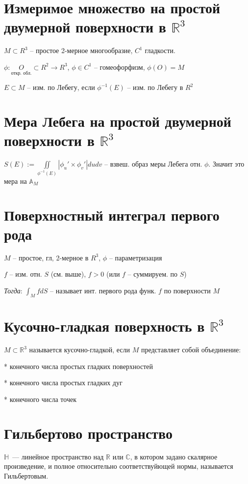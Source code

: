 \documentclass[paper=a4, fontsize=17pt]{article}
\begin{document}
	\section{Измеримое множество на простой двумерной поверхности в $\mathds{R}^3$}
	
	$ M \subset R^3 $ -- простое 2-мерное многообразие, $ C^1 $ гладкости.

	$ \phi : \underset{\text{откр. обл.}}{O} \subset R^2 \rightarrow R^3$, $ \phi \in C^1 $ -- гомеофорфизм, $ \phi(O) = M $

	$ E \subset M $ -- изм. по Лебегу, если $ \phi^{-1}(E) $ -- изм. по Лебегу в $ R^2 $
	
	\section{Мера Лебега на простой двумерной поверхности в $\mathds{R}^3$}

	$ S(E) := \iint\limits_{\phi^{-1}(E)} | \phi_u' \times \phi_v'| dudv $ -- взвеш. образ меры Лебега отн. $ \phi $. Значит это мера на $ \mathbb{A}_{M} $

	\section{Поверхностный интеграл первого рода}
        
        $ M $ -- простое, гл, 2-мерное в $ R^3 $, $ \phi $ -- параметризация

	$ f $ -- изм. отн. $S$ (см. выше), $ f > 0 $ (или $ f $ -- суммируем. по $ S $)

        \emph{Тогда}: $ \int_M f dS$ -- называет инт. первого рода функ. $ f $ по поверхности $M$

	\section{Кусочно-гладкая поверхность в $\mathds{R}^3$}
	
        $M \subset \mathbb R^3$ называется кусочно-гладкой, если $M$ представляет собой объединение:

	* конечного числа простых гладких поверхностей

	* конечного числа простых гладких дуг

	* конечного числа точек

	
	\section{Гильбертово пространство}
	$\mathds{H}$~--- линейное пространство над $\mathds{R}$ или $\mathds{C}$, в котором задано скалярное произведение, и полное относительно соответствуйющей нормы, называется Гильбертовым.
\end{document}
